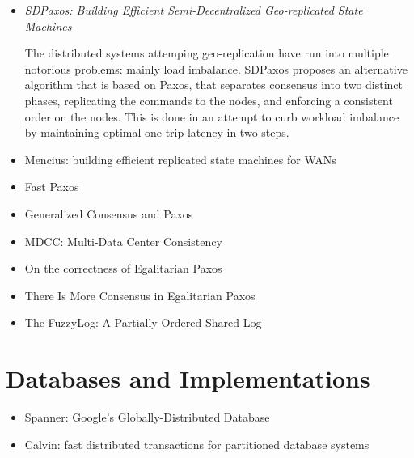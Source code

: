 \documentclass{article}
\begin{document}
\begin{itemize}
	\item
	\textit{SDPaxos: Building Efficient Semi-Decentralized Geo-replicated State Machines} \cite{zhao2018sdpaxos}

	The distributed systems attemping geo-replication have run into multiple notorious problems: mainly load imbalance.
	SDPaxos proposes an alternative algorithm that is based on Paxos, that separates consensus into two distinct phases, replicating the commands to the nodes, and enforcing a consistent order on the nodes.
	This is done in an attempt to curb workload imbalance by maintaining optimal one-trip latency in two steps.

	\item{Mencius: building efficient replicated state machines for WANs \cite{Mencius}}

	\item{Fast Paxos \cite{lamport2006fast}}

	\item{Generalized Consensus and Paxos \cite{lamport2005generalized}}

	\item{MDCC: Multi-Data Center Consistency \cite{MDCC}}

	\item{On the correctness of Egalitarian Paxos \cite{SutraEPaxos}}

	\item{There Is More Consensus in Egalitarian Paxos \cite{EPaxos}}

	\item{The FuzzyLog: A Partially Ordered Shared Log \cite{FuzzyLog}}
\end{itemize}

\section{Databases and Implementations}

\begin{itemize}
	\item{Spanner: Google's Globally-Distributed Database \cite{Spanner}}

	\item{Calvin: fast distributed transactions for partitioned database systems \cite{Calvin}}
\end{itemize}



\end{document}
